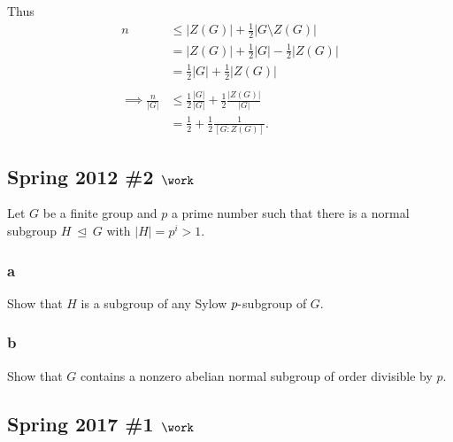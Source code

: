 \begin{solution}
Thus
\begin{align*}
n &\leq {\left\lvert {Z(G)} \right\rvert} + \frac 1 2{\left\lvert {G \setminus Z(G)} \right\rvert} \\
&= {\left\lvert {Z(G)} \right\rvert} + \frac 1 2{\left\lvert {G} \right\rvert} - \frac 1 2 {\left\lvert {Z(G)} \right\rvert} \\
&= \frac 1 2 {\left\lvert {G} \right\rvert} + \frac 1 2 {\left\lvert {Z(G)} \right\rvert} \\
\\
\implies \frac n {{\left\lvert {G} \right\rvert}}
&\leq \frac 1 2 \frac{{\left\lvert {G} \right\rvert}}{{\left\lvert {G} \right\rvert}}  + \frac 1 2 \frac{{\left\lvert {Z(G)} \right\rvert}}{{\left\lvert {G} \right\rvert}} \\
&= \frac 1 2 + \frac 1 2 \frac 1 {[G: Z(G)]}
.\end{align*}

\end{solution}

\hypertarget{spring-2012-2-work}{%
\subsection{\texorpdfstring{Spring 2012 \#2
\(\work\)}{Spring 2012 \#2 \textbackslash work}}\label{spring-2012-2-work}}

Let \(G\) be a finite group and \(p\) a prime number such that there is
a normal subgroup \(H{~\trianglelefteq~}G\) with
\({\left\lvert {H} \right\rvert} = p^i > 1\).

\hypertarget{a-2}{%
\subsubsection{a}\label{a-2}}

Show that \(H\) is a subgroup of any Sylow \(p{\hbox{-}}\)subgroup of
\(G\).

\hypertarget{b-2}{%
\subsubsection{b}\label{b-2}}

Show that \(G\) contains a nonzero abelian normal subgroup of order
divisible by \(p\).

\hypertarget{spring-2017-1-work}{%
\subsection{\texorpdfstring{Spring 2017 \#1
\(\work\)}{Spring 2017 \#1 \textbackslash work}}\label{spring-2017-1-work}}

